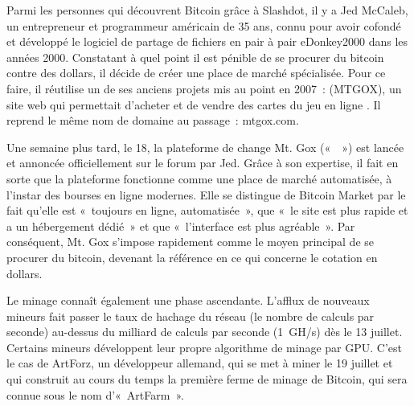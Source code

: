 Parmi les personnes qui découvrent Bitcoin grâce à Slashdot, il y a Jed McCaleb, un entrepreneur et programmeur américain de 35 ans, connu pour avoir cofondé et développé le logiciel de partage de fichiers en pair à pair eDonkey2000 dans les années 2000. Constatant à quel point il est pénible de se procurer du bitcoin contre des dollars, il décide de créer une place de marché spécialisée. Pour ce faire, il réutilise un de ses anciens projets mis au point en 2007~:  (MTGOX), un site web qui permettait d'acheter et de vendre des cartes du jeu en ligne . Il reprend le même nom de domaine au passage~: mtgox.com.

Une semaine plus tard, le 18, la plateforme de change Mt. Gox («~~») est lancée et annoncée officiellement sur le forum par Jed. Grâce à son expertise, il fait en sorte que la plateforme fonctionne comme une place de marché automatisée, à l'instar des bourses en ligne modernes. Elle se distingue de Bitcoin Market par le fait qu'elle est «~toujours en ligne, automatisée~», que «~le site est plus rapide et a un hébergement dédié~» et que «~l'interface est plus agréable~». Par conséquent, Mt. Gox s'impose rapidement comme le moyen principal de se procurer du bitcoin, devenant la référence en ce qui concerne le cotation en dollars.

Le minage connaît également une phase ascendante. L'afflux de nouveaux mineurs fait passer le taux de hachage du réseau (le nombre de calculs par seconde) au-dessus du milliard de calculs par seconde (1~GH/s) dès le 13 juillet. Certains mineurs développent leur propre algorithme de minage par GPU. C'est le cas de ArtForz, un développeur allemand, qui se met à miner le 19 juillet et qui construit au cours du temps la première ferme de minage de Bitcoin, qui sera connue sous le nom d'«~ArtFarm~».

